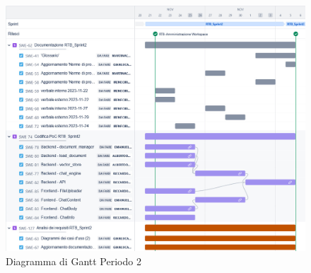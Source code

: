 \documentclass[10pt, a4paper]{article}
\begin{document}
{{{{{{{{\begin{itemize}
\end{itemize}
\vspace{1em}

 \begin{figure}[H]
        \centering        
        \includegraphics[width=15.5cm]{gantt/ganttPeriodo2.png}
        \caption{Diagramma di Gantt Periodo 2 }
    \end{figure}
\newpage
}}}}}}}}
\end{document}
